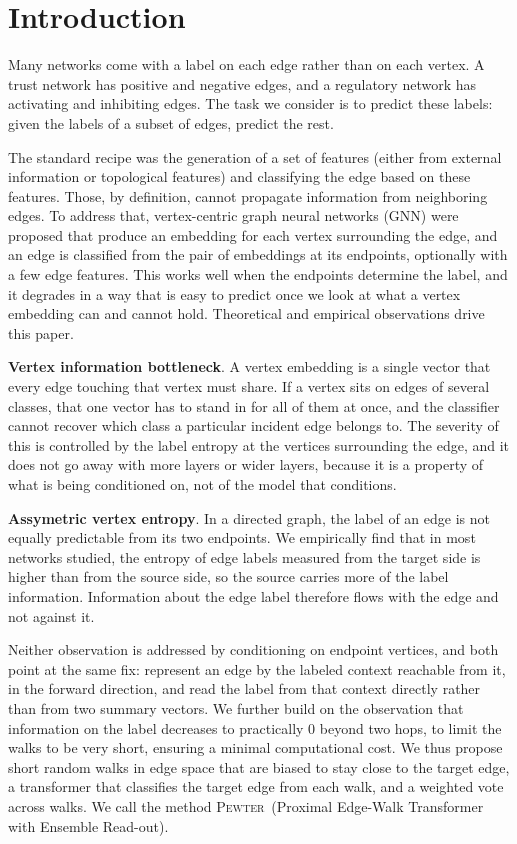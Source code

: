 \documentclass[letterpaper]{article} %
\newcommand{\method}{\textsc{Pewter}\xspace}
\theoremstyle{plain}
\theoremstyle{definition}
\begin{document}
\section{Introduction}

Many networks come with a label on each edge rather than on each vertex. A trust network has positive and negative edges, and a regulatory network has activating and inhibiting edges. The task we consider is to predict these labels: given the labels of a subset of edges, predict the rest.

The standard recipe was the generation of a set of features (either from external information or topological features) and classifying the edge based on these features. Those, by definition, cannot propagate information from neighboring edges. To address that, vertex-centric graph neural networks (GNN) were proposed that produce an embedding for each vertex surrounding the edge, and an edge is classified from the pair of embeddings at its endpoints, optionally with a few edge features. This works well when the endpoints determine the label, and it degrades in a way that is easy to predict once we look at what a vertex embedding can and cannot hold. Theoretical and empirical observations drive this paper.

\textbf{Vertex information bottleneck}. A vertex embedding is a single vector that every edge touching that vertex must share. If a vertex sits on edges of several classes, that one vector has to stand in for all of them at once, and the classifier cannot recover which class a particular incident edge belongs to. The severity of this is controlled by the label entropy at the vertices surrounding the edge, and it does not go away with more layers or wider layers, because it is a property of what is being conditioned on, not of the model that conditions.

\textbf{Assymetric vertex entropy}.  In a directed graph, the label of an edge is not equally predictable from its two endpoints. We empirically find that in most networks studied, the entropy of edge labels measured from the target side is higher than from the source side, so the source carries more of the label information. Information about the edge label therefore flows with the edge and not against it.

Neither observation is addressed by conditioning on endpoint vertices, and both point at the same fix: represent an edge by the labeled context reachable from it, in the forward direction, and read the label from that context directly rather than from two summary vectors. We further build on the observation that information on the label decreases to practically 0 beyond two hops, to limit the walks to be very short, ensuring a minimal computational cost. We thus propose short random walks in edge space that are biased to stay close to the target edge, a transformer that classifies the target edge from each walk, and a weighted vote across walks. We call the method \method\ (Proximal Edge-Walk Transformer with Ensemble Read-out).
\end{document}
